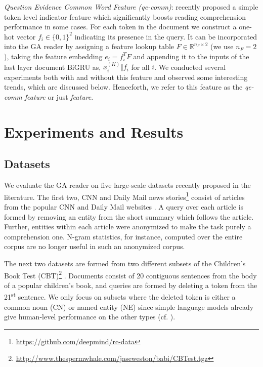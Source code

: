 \documentclass[11pt,a4paper]{article}
\begin{document}
\emph{Question Evidence Common Word Feature (qe-comm)}: \citet{li2016dataset} recently proposed a simple token level indicator feature which significantly boosts reading comprehension performance in some cases. For each token in the document we construct a one-hot vector $f_i \in \{0,1\}^2$ indicating its presence in the query. It can be incorporated into the GA reader by assigning a feature lookup table $F \in \mathbb{R}^{n_F \times 2}$ (we use $n_F=2$), taking the feature embedding $e_i=f_i^T F$ and appending it to the inputs of the last layer document BiGRU as, $x_i^{(K)} \Vert f_i$ for all $i$. We conducted several experiments both with and without this feature and observed some interesting trends, which are discussed below. Henceforth, we refer to this feature as the \textit{qe-comm feature} or just \textit{feature}.

\section{Experiments and Results}
\label{sec:results}
\subsection{Datasets}


We evaluate the GA reader on five large-scale datasets recently proposed in the literature. The first two, CNN and Daily Mail news stories\footnote{\scriptsize \url{https://github.com/deepmind/rc-data}} consist of articles from the popular CNN and Daily Mail websites \citep{hermann2015teaching}. A query over each article is formed by removing an entity from the short summary which follows the article. Further, entities within each article were anonymized to make the task purely a comprehension one. N-gram statistics, for instance, computed over the entire corpus are no longer useful in such an anonymized corpus.

The next two datasets are formed from two different subsets of the Children's Book Test (CBT)\footnote{\scriptsize \url{http://www.thespermwhale.com/jaseweston/babi/CBTest.tgz}} \citep{hill2015goldilocks}. Documents consist of 20 contiguous sentences from the body of a popular children's book, and queries are formed by deleting a token from the 21\textsuperscript{st} sentence. We only focus on subsets where the deleted token is either a common noun (CN) or named entity (NE) since simple language models already give human-level performance on the other types (cf. \citep{hill2015goldilocks}).
\end{document}
